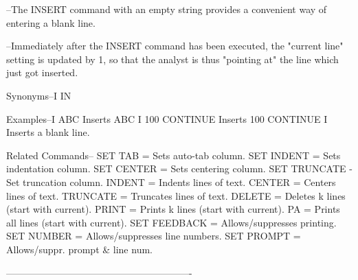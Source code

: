         --The INSERT command with an empty string
          provides a convenient way of entering
          a blank line.
 
        --Immediately after the INSERT command
          has been executed, the "current line"
          setting is updated by 1, so that the
          analyst is thus "pointing at" the
          line which just got inserted.
 
Synonyms--I
          IN
 
Examples--I ABC               Inserts ABC
          I 100 CONTINUE      Inserts 100 CONTINUE
          I                   Inserts a blank line.
 
Related Commands--
          SET TAB         = Sets auto-tab column.
          SET INDENT      = Sets indentation column.
          SET CENTER      = Sets centering column.
          SET TRUNCATE    - Set truncation column.
          INDENT          = Indents lines of text.
          CENTER          = Centers lines of text.
          TRUNCATE        = Truncates lines of text.
          DELETE          = Deletes k lines (start with current).
          PRINT           = Prints k lines (start with current).
          PA              = Prints all lines (start with current).
          SET FEEDBACK    = Allows/suppresses printing.
          SET NUMBER      = Allows/suppresses line numbers.
          SET PROMPT      = Allows/suppr. prompt & line num.
 
----------------------------------------------------------
 
 
 
 
 
 
 
 
 
 
 
 
 
 
 
 
 
 
 
 
 
 
 
 
 
 
 
 
 
 
 
 
 
 
 
 
 
 
 
 
 
 
 
 
 
 
 
 
 
